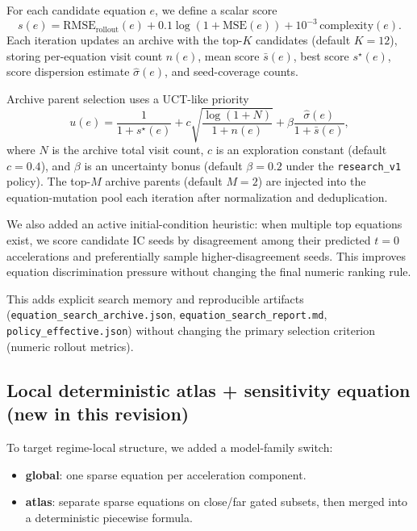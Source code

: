 \documentclass[11pt]{article}
\begin{document}
For each candidate equation $e$, we define a scalar score
\begin{equation*}
s(e)=\mathrm{RMSE}_{\mathrm{rollout}}(e)+0.1\log(1+\mathrm{MSE}(e))+10^{-3}\,\mathrm{complexity}(e).
\end{equation*}
Each iteration updates an archive with the top-$K$ candidates (default $K=12$), storing per-equation visit count $n(e)$, mean score $\bar{s}(e)$, best score $s^\star(e)$, score dispersion estimate $\hat{\sigma}(e)$, and seed-coverage counts.

Archive parent selection uses a UCT-like priority
\begin{equation*}
u(e)=\frac{1}{1+s^\star(e)}+c\sqrt{\frac{\log(1+N)}{1+n(e)}}+\beta\frac{\hat{\sigma}(e)}{1+\bar{s}(e)},
\end{equation*}
where $N$ is the archive total visit count, $c$ is an exploration constant (default $c=0.4$), and $\beta$ is an uncertainty bonus (default $\beta=0.2$ under the \texttt{research\_v1} policy). The top-$M$ archive parents (default $M=2$) are injected into the equation-mutation pool each iteration after normalization and deduplication.

We also added an active initial-condition heuristic: when multiple top equations exist, we score candidate IC seeds by disagreement among their predicted $t=0$ accelerations and preferentially sample higher-disagreement seeds. This improves equation discrimination pressure without changing the final numeric ranking rule.

This adds explicit search memory and reproducible artifacts (\texttt{equation\_search\_archive.json}, \texttt{equation\_search\_report.md}, \texttt{policy\_effective.json}) without changing the primary selection criterion (numeric rollout metrics).

\subsection{Local deterministic atlas + sensitivity equation (new in this revision)}
To target regime-local structure, we added a model-family switch:
\begin{itemize}
\item \textbf{global}: one sparse equation per acceleration component.
\item \textbf{atlas}: separate sparse equations on close/far gated subsets, then merged into a deterministic piecewise formula.
\end{itemize}
\end{document}

